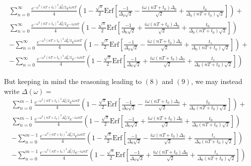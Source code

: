 \begin{gather}
\sum^{\infty}_{n=0}\frac{e^{-\omega^2(nT+t_0)^2\Delta^2_0/2}e^{i\omega nT}}{4}\left(1-\frac{\sqrt{\pi}}{2}\text{Erf}\left[\frac{-1}{\Delta_0\sqrt{2}}-\frac{i\omega (nT+t_0)\Delta_0}{\sqrt{2}}+\frac{t_0}{\Delta_0(nT+t_0)\sqrt{2}}\right]\right)+ \nonumber \\
\sum^{\infty}_{n=0}\frac{e^{-\omega^2(nT+t_0)^2\Delta^2_0/2}e^{-i\omega nT}}{4}\left(1-\frac{\sqrt{\pi}}{2}\text{Erf}\left[\frac{-1}{\Delta_0\sqrt{2}}+\frac{i\omega (nT+t_0)\Delta_0}{\sqrt{2}}+\frac{t_0}{\Delta_0(nT+t_0)\sqrt{2}}\right]\right) \nonumber \\
-\sum^{\infty}_{n=0}\frac{e^{-\omega^2(nT+t_0)^2\Delta^2_0/2}e^{i\omega nT}}{4}\left(1-\frac{\sqrt{\pi}}{2}\text{Erf}\left[\frac{-1}{\Delta_0\sqrt{2}}-\frac{i\omega (nT+t_0)\Delta_0}{\sqrt{2}}+\frac{t_s}{\Delta_0(nT+t_0)\sqrt{2}}\right]\right)+ \nonumber \\
-\sum^{\infty}_{n=0}\frac{e^{-\omega^2(nT+t_0)^2\Delta^2_0/2}e^{-i\omega nT}}{4}\left(1-\frac{\sqrt{\pi}}{2}\text{Erf}\left[\frac{-1}{\Delta_0\sqrt{2}}+\frac{i\omega (nT+t_0)\Delta_0}{\sqrt{2}}+\frac{t_s}{\Delta_0(nT+t_0)\sqrt{2}}\right]\right)
\end{gather}

But keeping in mind the reasoning leading to $(8)$ and $(9)$, we may instead write $\Delta(\omega)=$
\begin{gather}
\sum^{m-1}_{n=0}\frac{e^{-\omega^2(nT+t_0)^2\Delta^2_0/2}e^{i\omega nT}}{4}\left(1-\frac{\sqrt{\pi}}{2}\text{Erf}\left[\frac{-1}{\Delta_0\sqrt{2}}-\frac{i\omega (nT+t_0)\Delta_0}{\sqrt{2}}+\frac{t_0}{\Delta_0(nT+t_0)\sqrt{2}}\right]\right)\nonumber+\\ 
\sum^{m-1}_{n=0}\frac{e^{-\omega^2(nT+t_0)^2\Delta^2_0/2}e^{-i\omega nT}}{4}\left(1-\frac{\sqrt{\pi}}{2}\text{Erf}\left[\frac{-1}{\Delta_0\sqrt{2}}+\frac{i\omega (nT+t_0)\Delta_0}{\sqrt{2}}+\frac{t_0}{\Delta_0(nT+t_0)\sqrt{2}}\right]\right)\nonumber \\
-\sum^{m-1}_{n=0}\frac{e^{-\omega^2(nT+t_0)^2\Delta^2_0/2}e^{i\omega nT}}{4}\left(1-\frac{\sqrt{\pi}}{2}\text{Erf}\left[\frac{-1}{\Delta_0\sqrt{2}}-\frac{i\omega (nT+t_0)\Delta_0}{\sqrt{2}}+\frac{t_s}{\Delta_0(nT+t_0)\sqrt{2}}\right]\right)\nonumber \\ 
-\sum^{m-1}_{n=0}\frac{e^{-\omega^2(nT+t_0)^2\Delta^2_0/2}e^{-i\omega nT}}{4}\left(1-\frac{\sqrt{\pi}}{2}\text{Erf}\left[\frac{-1}{\Delta_0\sqrt{2}}+\frac{i\omega (nT+t_0)\Delta_0}{\sqrt{2}}+\frac{t_s}{\Delta_0(nT+t_0)\sqrt{2}}\right]\right)
\end{gather}

